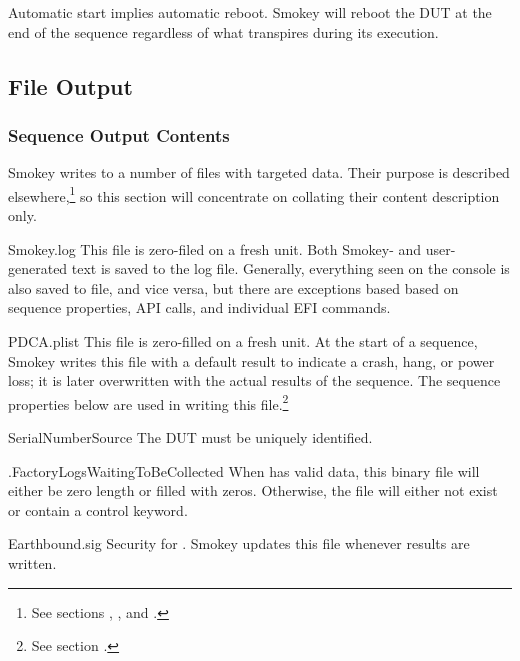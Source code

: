 Automatic start implies automatic reboot.  Smokey will reboot the DUT at the
end of the sequence regardless of what transpires during its execution.

\subsection{File Output}
\label{sec:FileOutput}

\subsubsection{Sequence Output Contents}

Smokey writes to a number of files with targeted data.  Their purpose is
described elsewhere,\footnote{See sections ,
, and .} so
this section will concentrate on collating their content description only.

\begin{Definition}

	\item[Smokey.log]  This file is zero-filed on a fresh unit.  Both
	Smokey- and user-generated text is saved to the log file.  Generally,
	everything seen on the console is also saved to file, and vice versa,
	but there are exceptions based based on sequence properties, API calls,
	and individual EFI commands.

	\item[PDCA.plist] This file is zero-filled on a fresh unit.  At the
	start of a sequence, Smokey writes this file with a default result to
	indicate a crash, hang, or power loss; it is later overwritten with the
	actual results of the sequence.  The sequence properties below are used
	in writing this file.\footnote{See section
	.\label{fn:OutputSmokeyProps}}

	\begin{Descriptive}

		\item[SerialNumberSource] The DUT must be uniquely identified.

	\end{Descriptive}

	\item[.FactoryLogsWaitingToBeCollected] When  has
	valid data, this binary file will either be zero length or filled with
	zeros.  Otherwise, the file will either not exist or contain a control
	keyword.

	\item[Earthbound.sig] Security for .  Smokey
	updates this file whenever results are written.

\end{Definition}

